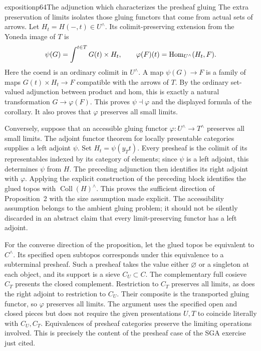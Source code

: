 \begin{dcomment}{exposition}{p64}{The adjunction which characterizes the presheaf gluing}
The extra preservation of limits isolates those gluing functors that come from actual sets of arrows. Let $H_t=H(-,t)\in U^\wedge$. Its colimit-preserving extension from the Yoneda image of $T$ is
\[
 \psi(G)=\int^{t\in T}G(t)\times H_t,
 \qquad
 \varphi(F)(t)=\mathrm{Hom}_{U^\wedge}(H_t,F).
\]
Here the coend is an ordinary colimit in $U^\wedge$. A map $\psi(G)\to F$ is a family of maps $G(t)\times H_t\to F$ compatible with the arrows of $T$. By the ordinary set-valued adjunction between product and hom, this is exactly a natural transformation $G\to\varphi(F)$. This proves $\psi\dashv\varphi$ and the displayed formula of the corollary. It also proves that $\varphi$ preserves all small limits.

Conversely, suppose that an accessible gluing functor $\varphi:U^\wedge\to T^\wedge$ preserves all small limits. The adjoint functor theorem for locally presentable categories supplies a left adjoint $\psi$. Set $H_t=\psi(y_Tt)$. Every presheaf is the colimit of its representables indexed by its category of elements; since $\psi$ is a left adjoint, this determines $\psi$ from $H$. The preceding adjunction then identifies its right adjoint with $\varphi$. Applying the explicit construction of the preceding block identifies the glued topos with $\operatorname{Coll}(H)^\wedge$. This proves the sufficient direction of Proposition~2 with the size assumption made explicit. The accessibility assumption belongs to the ambient gluing problem; it should not be silently discarded in an abstract claim that every limit-preserving functor has a left adjoint.

For the converse direction of the proposition, let the glued topos be equivalent to $C^\wedge$. Its specified open subtopos corresponds under this equivalence to a subterminal presheaf. Such a presheaf takes the value either $\varnothing$ or a singleton at each object, and its support is a sieve $C_U\subset C$. The complementary full cosieve $C_T$ presents the closed complement. Restriction to $C_T$ preserves all limits, as does the right adjoint to restriction to $C_U$. Their composite is the transported gluing functor, so $\varphi$ preserves all limits. The argument uses the specified open and closed pieces but does not require the given presentations $U,T$ to coincide literally with $C_U,C_T$. Equivalences of presheaf categories preserve the limiting operations involved. This is precisely the content of the presheaf case of the SGA exercise just cited.


\end{dcomment}
